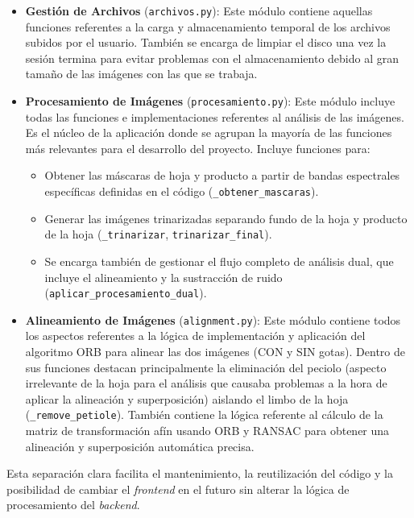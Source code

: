 \begin{itemize}
    \item \textbf{Gestión de Archivos} (\texttt{archivos.py}): Este módulo contiene aquellas funciones referentes a la carga y almacenamiento temporal de los archivos subidos por el usuario. También se encarga de limpiar el disco una vez la sesión termina para evitar problemas con el almacenamiento debido al gran tamaño de las imágenes con las que se trabaja.
    \item \textbf{Procesamiento de Imágenes} (\texttt{procesamiento.py}): Este módulo incluye todas las funciones e implementaciones referentes al análisis de las imágenes. Es el núcleo de la aplicación donde se agrupan la mayoría de las funciones más relevantes para el desarrollo del proyecto. Incluye funciones para:
        \begin{itemize}
            \item Obtener las máscaras de hoja y producto a partir de bandas espectrales específicas definidas en el código (\verb|_obtener_mascaras|).
            \item Generar las imágenes trinarizadas separando fundo de la hoja y producto de la hoja  (\verb|_trinarizar|, \verb|trinarizar_final|).
            \item Se encarga también de gestionar el flujo completo de análisis dual, que incluye el alineamiento y la sustracción de ruido (\verb|aplicar_procesamiento_dual|).
        \end{itemize}
    \item \textbf{Alineamiento de Imágenes} (\texttt{alignment.py}): Este módulo contiene todos los aspectos referentes a la lógica de implementación y aplicación del algoritmo ORB para alinear las dos imágenes (CON y SIN gotas). Dentro de sus funciones destacan principalmente la eliminación del peciolo (aspecto irrelevante de la hoja para el análisis que causaba problemas a la hora de aplicar la alineación y superposición) aislando el limbo de la hoja (\verb|_remove_petiole|). También contiene la lógica referente al cálculo de la matriz de transformación afín usando ORB y RANSAC para obtener una alineación y superposición automática precisa.

\end{itemize}


Esta separación clara facilita el mantenimiento, la reutilización del código y la posibilidad de cambiar el \textit{frontend} en el futuro sin alterar la lógica de procesamiento del \textit{backend}.

